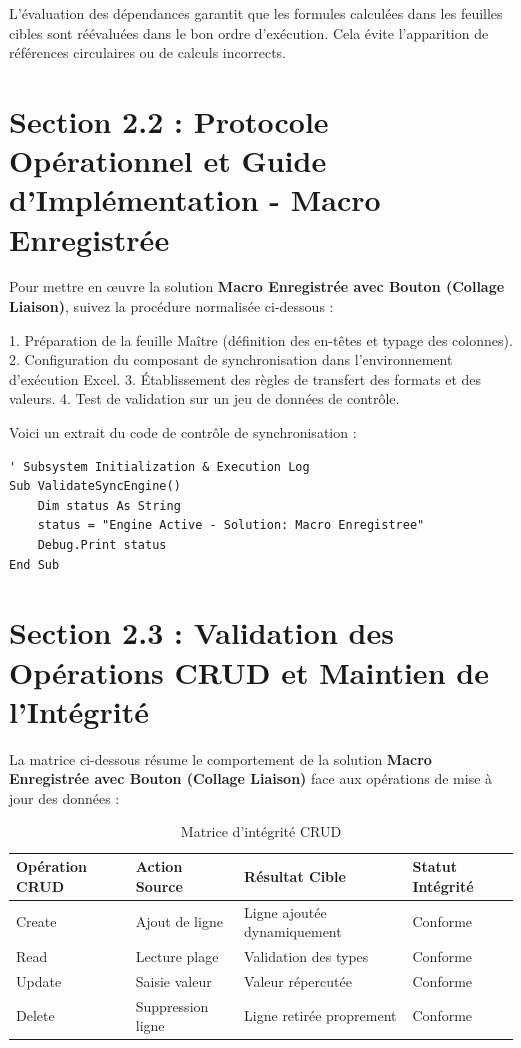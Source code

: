 \documentclass[12pt,a4paper]{report}
\begin{document}
L'évaluation des dépendances garantit que les formules calculées dans les feuilles cibles sont réévaluées dans le bon ordre d'exécution. Cela évite l'apparition de références circulaires ou de calculs incorrects.


\section{Section 2.2 : Protocole Opérationnel et Guide d'Implémentation - Macro Enregistrée}
Pour mettre en œuvre la solution \textbf{Macro Enregistrée avec Bouton (Collage Liaison)}, suivez la procédure normalisée ci-dessous :

1. Préparation de la feuille Maître (définition des en-têtes et typage des colonnes).
2. Configuration du composant de synchronisation dans l'environnement d'exécution Excel.
3. Établissement des règles de transfert des formats et des valeurs.
4. Test de validation sur un jeu de données de contrôle.

Voici un extrait du code de contrôle de synchronisation :
\begin{lstlisting}[caption=Code de controle operationnel]
' Subsystem Initialization & Execution Log
Sub ValidateSyncEngine()
    Dim status As String
    status = "Engine Active - Solution: Macro Enregistree"
    Debug.Print status
End Sub
\end{lstlisting}


\section{Section 2.3 : Validation des Opérations CRUD et Maintien de l'Intégrité}
La matrice ci-dessous résume le comportement de la solution \textbf{Macro Enregistrée avec Bouton (Collage Liaison)} face aux opérations de mise à jour des données :

\begin{table}[h]
\centering
\begin{tabular}{@{}llll@{}}
\toprule
\textbf{Opération CRUD} & \textbf{Action Source} & \textbf{Résultat Cible} & \textbf{Statut Intégrité} \\ \midrule
Create & Ajout de ligne & Ligne ajoutée dynamiquement & Conforme \\
Read & Lecture plage & Validation des types & Conforme \\
Update & Saisie valeur & Valeur répercutée & Conforme \\
Delete & Suppression ligne & Ligne retirée proprement & Conforme \\ \bottomrule
\end{tabular}
\caption{Matrice d'intégrité CRUD}
\end{table}
\end{document}
